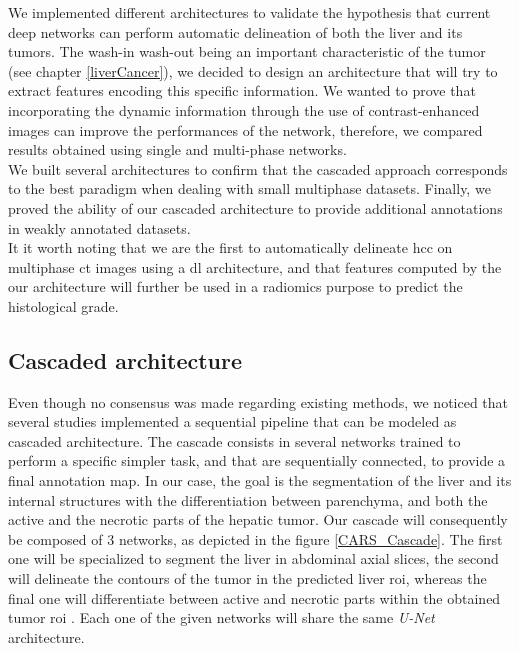 We implemented different architectures to validate the hypothesis that
current deep networks can perform automatic delineation of both the
liver and its tumors. The wash-in wash-out being an important characteristic of the tumor (see chapter \ref{liverCancer}), we decided to design an architecture that will try to extract features encoding this specific information. We wanted to prove that incorporating the dynamic information through the use of contrast-enhanced images can improve the performances of the network, therefore, we compared results obtained using single and multi-phase networks. \\
We built several architectures to confirm that the cascaded approach corresponds to the best paradigm when dealing with small multiphase datasets.
Finally, we proved the ability of our cascaded architecture to provide additional annotations in weakly annotated datasets.\\
It it worth noting that we are the first to automatically 
delineate \ac{hcc} on multiphase \ac{ct} images using a \ac{dl} architecture, and that features computed by the our architecture will further be used in a radiomics purpose to predict the histological grade.



\subsection{Cascaded architecture}

Even though no consensus was made regarding existing methods, we noticed that
several studies implemented a sequential pipeline that can be modeled as
cascaded architecture. The cascade consists in several networks trained
to perform a specific simpler task, and that are sequentially connected, to
provide a final annotation map. In our case, the goal is the
segmentation of the liver and its internal structures with the
differentiation between parenchyma, and both the active and the necrotic
parts of the hepatic tumor.
Our cascade will consequently be composed of 3 networks, as depicted
in the figure \ref{CARS_Cascade}. The first one will be specialized to segment the liver in
abdominal axial slices, the second will delineate the contours of the
tumor in the predicted liver \ac{roi}, whereas the final one will
differentiate between active and necrotic parts within the obtained
tumor \ac{roi} \cite{Ouhmich2019}.
Each one of the given networks will share the same \emph{U-Net}
architecture.

